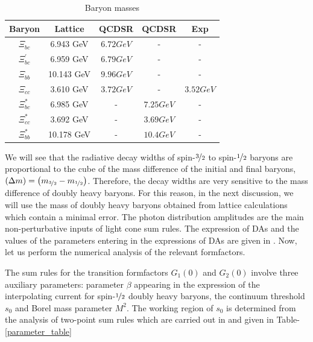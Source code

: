 \begin{table}[ht]
    \centering
    \begin{tabular}{|c|c|c|c|c|}
         \hline
         Baryon & Lattice\cite{lattice_masses} &  QCDSR\cite{AlievOctet} & QCDSR\cite{AlievDecuplet} & Exp\cite{xi+,xi++}\\
         \hline
         $\Xi_{bc}$ & 6.943 GeV & $6.72 GeV$ & - & -  \\
         \hline
         $\Xi_{bc}^{\prime}$ & 6.959 GeV & $6.79 GeV$ & - & - \\
         \hline
         $\Xi_{bb}$ & 10.143 GeV & $9.96 GeV$ & - & - \\
         \hline
         $\Xi_{cc}$ & 3.610 GeV& $3.72 GeV$ & - & $3.52 GeV$  \\
         \hline
         $\Xi^{\ast}_{bc}$ & 6.985 GeV& - & $7.25 GeV$& -  \\
         \hline
         $\Xi^{\ast}_{cc}$ & 3.692 GeV& - &  $3.69  GeV$& - \\
         \hline
         $\Xi^{\ast}_{bb}$ & 10.178 GeV & - & $10.4  GeV$& -  \\
         \hline
    \end{tabular}
    \caption{Baryon masses}
    \label{masstable}
\end{table}
We will see that the radiative decay widths of spin-$\nicefrac{3}{2}$ to spin-$\nicefrac{1}{2}$ baryons are proportional to the cube of the mass difference of the initial and final baryons, $\left(\Delta m\right) = \left(m_{\nicefrac{3}{2}}-m_{\nicefrac{1}{2}}\right)$. Therefore, the decay widths are very sensitive to the mass difference of doubly heavy baryons. For this reason, in the next discussion, we will use the mass of doubly heavy baryons obtained from lattice calculations which contain a minimal error.
The photon distribution amplitudes are the main non-perturbative inputs of light cone sum rules. The expression of DAs and the values of the parameters entering in the expressions of DAs are given in \cite{PhotonDA}. Now, let us perform the numerical analysis of the relevant formfactors.

The sum rules for the transition formfactors $G_1(0)$ and $G_2(0)$ involve three auxiliary parameters: parameter $\beta$ appearing in the expression of the interpolating current for spin-$\nicefrac{1}{2}$ doubly heavy baryons, the continuum threshold $s_0$ and Borel mass parameter $M^2$. The working region of $s_0$ is determined from the analysis of two-point sum rules which are carried out in \cite{AlievOctet,AlievDecuplet} and given in Table-\ref{parameter_table}

